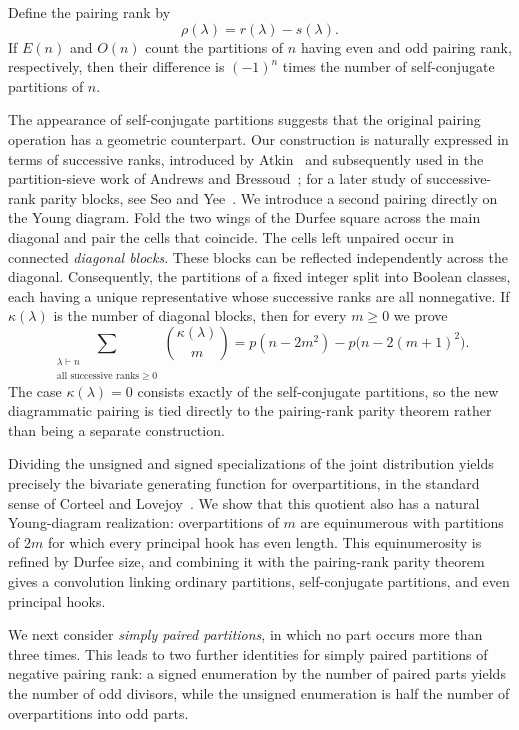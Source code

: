 \documentclass[11pt]{article}
\theoremstyle{definition}
\theoremstyle{remark}
\begin{document}
Define the pairing rank by
\[
 \rho(\lambda)=r(\lambda)-s(\lambda).
\]
If $E(n)$ and $O(n)$ count the partitions of $n$ having even and odd pairing rank, respectively, then their difference is $(-1)^n$ times the number of self-conjugate partitions of $n$.

The appearance of self-conjugate partitions suggests that the original pairing operation has a geometric counterpart.  Our construction is naturally expressed in terms of successive ranks, introduced by Atkin~\cite{Atkin1966} and subsequently used in the partition-sieve work of Andrews and Bressoud~\cite{Andrews1972,Bressoud1980}; for a later study of successive-rank parity blocks, see Seo and Yee~\cite{SeoYee2018}.  We introduce a second pairing directly on the Young diagram.  Fold the two wings of the Durfee square across the main diagonal and pair the cells that coincide.  The cells left unpaired occur in connected \emph{diagonal blocks}.  These blocks can be reflected independently across the diagonal.  Consequently, the partitions of a fixed integer split into Boolean classes, each having a unique representative whose successive ranks are all nonnegative.  If $\kappa(\lambda)$ is the number of diagonal blocks, then for every $m\geq0$ we prove
\[
 \sum_{\substack{\lambda\vdash n\\ \text{all successive ranks}\geq0}}
 \binom{\kappa(\lambda)}{m}
 =p(n-2m^2)-p\bigl(n-2(m+1)^2\bigr).
\]
The case $\kappa(\lambda)=0$ consists exactly of the self-conjugate partitions, so the new diagrammatic pairing is tied directly to the pairing-rank parity theorem rather than being a separate construction.

Dividing the unsigned and signed specializations of the joint distribution yields precisely the bivariate generating function for overpartitions, in the standard sense of Corteel and Lovejoy~\cite{CorteelLovejoy2004}.  We show that this quotient also has a natural Young-diagram realization: overpartitions of $m$ are equinumerous with partitions of $2m$ for which every principal hook has even length.  This equinumerosity is refined by Durfee size, and combining it with the pairing-rank parity theorem gives a convolution linking ordinary partitions, self-conjugate partitions, and even principal hooks.

We next consider \emph{simply paired partitions}, in which no part occurs more than three times. This leads to two further identities for simply paired partitions of negative pairing rank: a signed enumeration by the number of paired parts yields the number of odd divisors, while the unsigned enumeration is half the number of overpartitions into odd parts.
\end{document}
